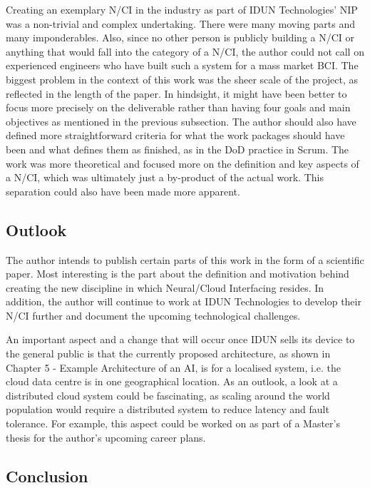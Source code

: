 Creating an exemplary N/CI in the industry as part of IDUN Technologies' NIP was a non-trivial and complex undertaking. There were many moving parts and many imponderables. Also, since no other person is publicly building a N/CI or anything that would fall into the category of a N/CI, the author could not call on experienced engineers who have built such a system for a mass market BCI. The biggest problem in the context of this work was the sheer scale of the project, as reflected in the length of the paper. In hindsight, it might have been better to focus more precisely on the deliverable rather than having four goals and main objectives as mentioned in the previous subsection. The author should also have defined more straightforward criteria for what the work packages should have been and what defines them as finished, as in the DoD practice in Scrum. The work was more theoretical and focused more on the definition and key aspects of a N/CI, which was ultimately just a by-product of the actual work. This separation could also have been made more apparent.

\subsection{Outlook}
\label{chapter5-outlook}

The author intends to publish certain parts of this work in the form of a scientific paper. Most interesting is the part about the definition and motivation behind creating the new discipline in which Neural/Cloud Interfacing resides. In addition, the author will continue to work at IDUN Technologies to develop their N/CI further and document the upcoming technological challenges.

An important aspect and a change that will occur once IDUN sells its device to the general public is that the currently proposed architecture, as shown in Chapter 5 - Example Architecture of an AI, is for a localised system, i.e. the cloud data centre is in one geographical location. As an outlook, a look at a distributed cloud system could be fascinating, as scaling around the world population would require a distributed system to reduce latency and fault tolerance. For example, this aspect could be worked on as part of a Master's thesis for the author's upcoming career plans.

\subsection{Conclusion}
\label{chapter5-conclusion}

